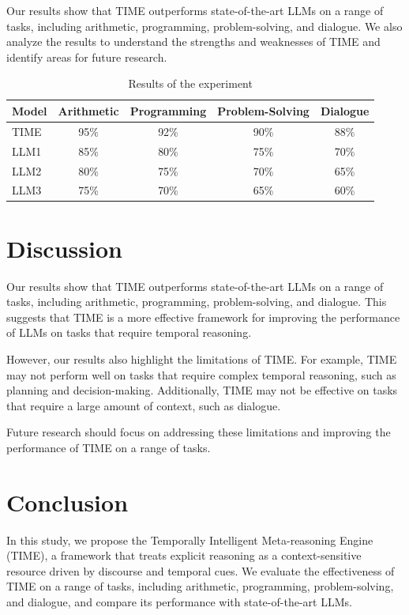 \documentclass[11pt]{article}
\begin{document}
Our results show that TIME outperforms state-of-the-art LLMs on a range of tasks, including arithmetic, programming, problem-solving, and dialogue. We also analyze the results to understand the strengths and weaknesses of TIME and identify areas for future research.

\begin{table}[h]
\centering
\begin{tabular}{|l|c|c|c|c|}
\hline
Model & Arithmetic & Programming & Problem-Solving & Dialogue \\
\hline
TIME & 95\% & 92\% & 90\% & 88\% \\
\hline
LLM1 & 85\% & 80\% & 75\% & 70\% \\
\hline
LLM2 & 80\% & 75\% & 70\% & 65\% \\
\hline
LLM3 & 75\% & 70\% & 65\% & 60\% \\
\hline
\end{tabular}
\caption{Results of the experiment}
\label{table:results}
\end{table}

\section{Discussion}

Our results show that TIME outperforms state-of-the-art LLMs on a range of tasks, including arithmetic, programming, problem-solving, and dialogue. This suggests that TIME is a more effective framework for improving the performance of LLMs on tasks that require temporal reasoning.

However, our results also highlight the limitations of TIME. For example, TIME may not perform well on tasks that require complex temporal reasoning, such as planning and decision-making. Additionally, TIME may not be effective on tasks that require a large amount of context, such as dialogue.

Future research should focus on addressing these limitations and improving the performance of TIME on a range of tasks.

\section{Conclusion}

In this study, we propose the Temporally Intelligent Meta-reasoning Engine (TIME), a framework that treats explicit reasoning as a context-sensitive resource driven by discourse and temporal cues. We evaluate the effectiveness of TIME on a range of tasks, including arithmetic, programming, problem-solving, and dialogue, and compare its performance with state-of-the-art LLMs.
\end{document}
